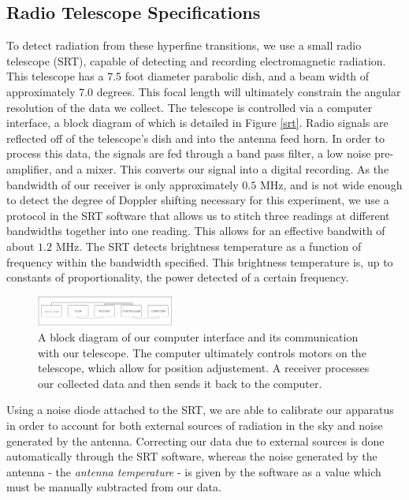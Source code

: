 \subsection{Radio Telescope Specifications}
To detect radiation from these hyperfine transitions, we use a small radio telescope (SRT), capable of detecting and recording electromagnetic radiation. This telescope has a 7.5 foot diameter parabolic dish, and a beam width of approximately 7.0 degrees. This focal length will ultimately constrain the angular resolution of the data we collect. The telescope is controlled via a computer interface, a block diagram of which is detailed in Figure \ref{srt}. Radio signals are reflected off of the telescope's dish and into the antenna feed horn. In order to process this data, the signals are fed through a band pass filter, a low noise pre-amplifier, and a mixer. This converts our signal into a digital recording. As the bandwidth of our receiver is only approximately $0.5$ MHz, and is not wide enough to detect the degree of Doppler shifting necessary for this experiment, we use a protocol in the SRT software that allows us to stitch three readings at different bandwidths together into one reading. This allows for an effective bandwith of about $1.2$ MHz. The SRT detects brightness temperature as a function of frequency within the bandwidth specified. This brightness temperature is, up to constants of proportionality, the power detected of a certain frequency.

\begin{figure}[h]
  \includegraphics[width=0.4\textwidth]{block}
  \caption{A block diagram of our computer interface and its communication with our telescope. The computer ultimately controls motors on the telescope, which allow for position adjustement. A receiver processes our collected data and then sends it back to the computer.}
\end{figure}
Using a noise diode attached to the SRT, we are able to calibrate our apparatus in order to account for both external sources of radiation in the sky and noise generated by the antenna. Correcting our data due to external sources is done automatically through the SRT software, whereas the noise generated by the antenna - the \textit{antenna temperature} - is given by the software as a value which must be manually subtracted from our data.

